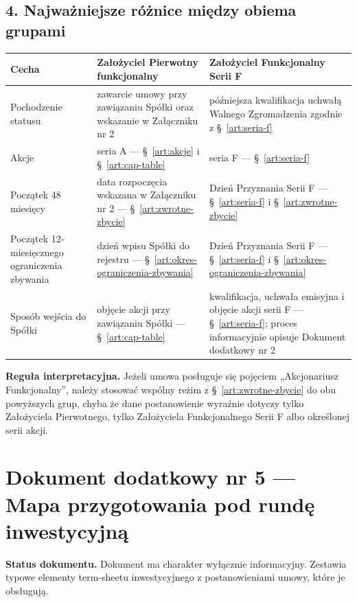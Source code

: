 \documentclass[12pt,a4paper]{report}
\begin{document}
\subsection*{4. Najważniejsze różnice między obiema grupami}

\begin{longtable}{p{4.2cm} p{5.0cm} p{5.0cm}}
\toprule
\textbf{Cecha} & \textbf{Założyciel Pierwotny funkcjonalny} & \textbf{Założyciel Funkcjonalny Serii F} \\
\midrule
Pochodzenie statusu & zawarcie umowy przy zawiązaniu Spółki oraz wskazanie w Załączniku nr 2 & późniejsza kwalifikacja uchwałą Walnego Zgromadzenia zgodnie z §~\ref{art:seria-f} \\
Akcje & seria A --- §~\ref{art:akcje} i §~\ref{art:cap-table} & seria F --- §~\ref{art:seria-f} \\
Początek 48 miesięcy & data rozpoczęcia wskazana w Załączniku nr 2 --- §~\ref{art:zwrotne-zbycie} & Dzień Przyznania Serii F --- §~\ref{art:seria-f} i §~\ref{art:zwrotne-zbycie} \\
Początek 12-miesięcznego ograniczenia zbywania & dzień wpisu Spółki do rejestru --- §~\ref{art:okres-ograniczenia-zbywania} & Dzień Przyznania Serii F --- §~\ref{art:seria-f} i §~\ref{art:okres-ograniczenia-zbywania} \\
Sposób wejścia do Spółki & objęcie akcji przy zawiązaniu Spółki --- §~\ref{art:cap-table} & kwalifikacja, uchwała emisyjna i objęcie akcji serii F --- §~\ref{art:seria-f}; proces informacyjnie opisuje Dokument dodatkowy nr 2 \\
\bottomrule
\end{longtable}

\textbf{Reguła interpretacyjna.} Jeżeli umowa posługuje się pojęciem „Akcjonariusz Funkcjonalny”, należy stosować wspólny reżim z §~\ref{art:zwrotne-zbycie} do obu powyższych grup, chyba że dane postanowienie wyraźnie dotyczy tylko Założyciela Pierwotnego, tylko Założyciela Funkcjonalnego Serii F albo określonej serii akcji.


\clearpage
\section*{Dokument dodatkowy nr 5 — Mapa przygotowania pod rundę inwestycyjną}
\label{annex:mapa-rundy}

\textbf{Status dokumentu.} Dokument ma charakter wyłącznie informacyjny. Zestawia typowe elementy term-sheetu inwestycyjnego z postanowieniami umowy, które je obsługują.
\end{document}
